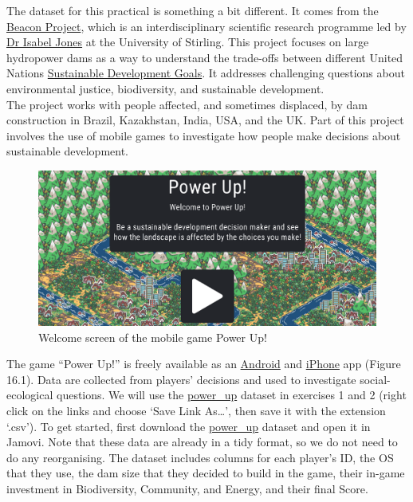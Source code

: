 \documentclass[
]{scrbook}
\begin{document}
The dataset for this practical is something a bit different.
It comes from the \href{https://www.thebeaconproject.net/}{Beacon Project}, which is an interdisciplinary scientific research programme led by \href{https://www.stir.ac.uk/people/256518}{Dr Isabel Jones} at the University of Stirling.
This project focuses on large hydropower dams as a way to understand the trade-offs between different United Nations \href{https://sdgs.un.org/goals}{Sustainable Development Goals}.
It addresses challenging questions about environmental justice, biodiversity, and sustainable development.\\
The project works with people affected, and sometimes displaced, by dam construction in Brazil, Kazakhstan, India, USA, and the UK.
Part of this project involves the use of mobile games to investigate how people make decisions about sustainable development.

\begin{figure}
\includegraphics[width=0.8\linewidth]{img/power_up} \caption{Welcome screen of the mobile game Power Up!}\label{fig:unnamed-chunk-69}
\end{figure}

The game ``Power Up!'' is freely available as an \href{https://play.google.com/store/apps/details?id=com.hyperluminal.stirlinguniversity.sustainabledevelopmentgame}{Android} and \href{https://apps.apple.com/gb/app/power-up/id1585634888}{iPhone} app (Figure 16.1).
Data are collected from players' decisions and used to investigate social-ecological questions.
We will use the \href{https://raw.githubusercontent.com/bradduthie/SCIU4T4/main/data/power_up.csv}{power\_up} dataset in exercises 1 and 2 (right click on the links and choose `Save Link As\ldots{}', then save it with the extension `.csv').
To get started, first download the \href{https://raw.githubusercontent.com/bradduthie/SCIU4T4/main/data/power_up.csv}{power\_up} dataset and open it in Jamovi.
Note that these data are already in a tidy format, so we do not need to do any reorganising.
The dataset includes columns for each player's ID, the OS that they use, the dam size that they decided to build in the game, their in-game investment in Biodiversity, Community, and Energy, and their final Score.
\end{document}

